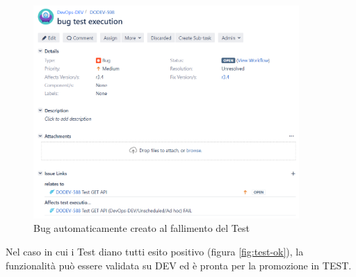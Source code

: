 \documentclass[a4paper, 12pt]{report}
\numberwithin{equation}{section}
\begin{document}
\begin{figure}
    \centering
    \includegraphics[width=0.9\textwidth]{imgs/bug.png}
    \caption{Bug automaticamente creato al fallimento del Test}
    \label{fig:bug}
\end{figure}
Nel caso in cui i Test diano tutti esito positivo (figura \ref{fig:test-ok}), la funzionalità può essere validata su DEV ed è pronta per la promozione in TEST.
\end{document}
